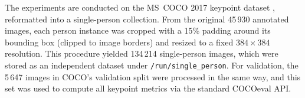 The experiments are conducted on the MS~COCO 2017 keypoint dataset \cite{Lin2014COCO}, reformatted into a single-person collection.  
From the original 45\,930 annotated images, each person instance was cropped with a 15\% padding around its bounding box (clipped to image borders) and resized to a fixed $384\times384$ resolution.  This procedure yielded 134\,214 single-person images, which were stored as an independent dataset under \texttt{/run/single\_person}.  For validation, the 5\,647 images in COCO’s validation split were processed in the same way, and this set was used to compute all keypoint metrics via the standard COCOeval API.
